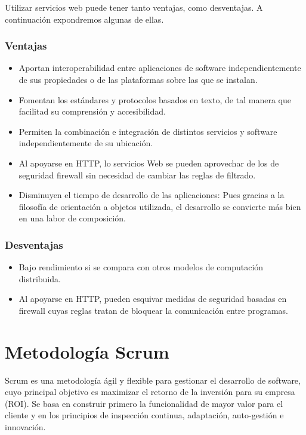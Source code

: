 	Utilizar servicios web puede tener tanto ventajas, como desventajas. A continuación expondremos algunas de ellas.

	\subsubsection{Ventajas}
	\begin{itemize}
		\item Aportan interoperabilidad entre aplicaciones de software independientemente de sus propiedades o de las plataformas sobre las que se instalan.
		\item Fomentan los estándares y protocolos basados en texto, de tal manera que facilitad su comprensión y accesibilidad.
		\item Permiten la combinación e integración de distintos servicios y software independientemente de su ubicación.
		\item  Al apoyarse en HTTP, lo servicios Web se pueden aprovechar de los  de seguridad firewall sin necesidad de cambiar las reglas de filtrado.
		\item Disminuyen el tiempo de desarrollo de las aplicaciones: Pues gracias a la filosofía de orientación a objetos utilizada, el desarrollo se convierte más bien en una labor de composición.
	\end{itemize}
	\subsubsection{Desventajas}
	\begin{itemize}
		\item Bajo rendimiento si se compara con otros modelos de computación distribuida.
		\item Al apoyarse en HTTP, pueden esquivar medidas de seguridad basadas en firewall cuyas reglas tratan de bloquear la comunicación entre programas.
	\end{itemize}
	
	
\section{Metodología Scrum}
	Scrum es una metodología ágil y flexible para gestionar el desarrollo de software, cuyo principal objetivo es maximizar el retorno de la inversión para su empresa (ROI). Se basa en construir primero la funcionalidad de mayor valor para el cliente y en los principios de inspección continua, adaptación, auto-gestión e innovación.
	
